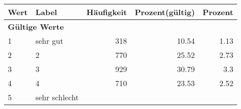      \begin{longtable}{lXrrr}
     \toprule
     \textbf{Wert} & \textbf{Label} & \textbf{Häufigkeit} & \textbf{Prozent(gültig)} & \textbf{Prozent} \\
     \endhead
     \midrule
     \multicolumn{5}{l}{\textbf{Gültige Werte}}\\

     1 &
     \multicolumn{1}{X}{ sehr gut   } &


       \num{318} &
       \num[round-mode=places,round-precision=2]{10.54} &
         \num[round-mode=places,round-precision=2]{1.13} \\

     2 &
     \multicolumn{1}{X}{ 2   } &


       \num{770} &
       \num[round-mode=places,round-precision=2]{25.52} &
         \num[round-mode=places,round-precision=2]{2.73} \\

     3 &
     \multicolumn{1}{X}{ 3   } &


       \num{929} &
       \num[round-mode=places,round-precision=2]{30.79} &
         \num[round-mode=places,round-precision=2]{3.3} \\

     4 &
     \multicolumn{1}{X}{ 4   } &


       \num{710} &
       \num[round-mode=places,round-precision=2]{23.53} &
         \num[round-mode=places,round-precision=2]{2.52} \\

     5 &
     \multicolumn{1}{X}{ sehr schlecht   } &



\end{longtable}

